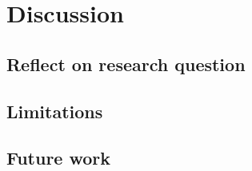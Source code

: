 \chapter{Discussion}\label{ch:discussion}

\section{Reflect on research question}


\section{Limitations}


\section{Future work}